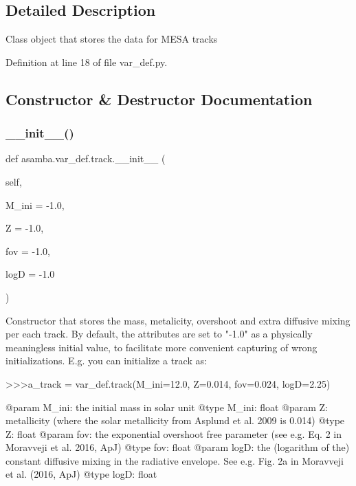 \subsection{Detailed Description}
\begin{DoxyVerb}Class object that stores the data for MESA tracks
\end{DoxyVerb}
 

Definition at line 18 of file var\+\_\+def.\+py.



\subsection{Constructor \& Destructor Documentation}
\mbox{\label{classasamba_1_1var__def_1_1track_a4b2441ffcfecbec92fb57d7d57aa3939}} 
\subsubsection{\texorpdfstring{\+\_\+\+\_\+init\+\_\+\+\_\+()}{\_\_init\_\_()}}
{\footnotesize\ttfamily def asamba.\+var\+\_\+def.\+track.\+\_\+\+\_\+init\+\_\+\+\_\+ (\begin{DoxyParamCaption}\item[{}]{self,  }\item[{}]{M\+\_\+ini = {\ttfamily -\/1.0},  }\item[{}]{Z = {\ttfamily -\/1.0},  }\item[{}]{fov = {\ttfamily -\/1.0},  }\item[{}]{logD = {\ttfamily -\/1.0} }\end{DoxyParamCaption})}

\begin{DoxyVerb}Constructor that stores the mass, metalicity, overshoot and extra diffusive mixing per each 
track. By default, the attributes are set to "-1.0" as a physically meaningless initial value,
to facilitate more convenient capturing of wrong initializations. E.g. you can initialize a track
as:

>>>a_track = var_def.track(M_ini=12.0, Z=0.014, fov=0.024, logD=2.25)

@param M_ini: the initial mass in solar unit
@type M_ini: float
@param Z: metallicity (where the solar metallicity from Asplund et al. 2009 is 0.014)
@type Z: float
@param fov: the exponential overshoot free parameter (see e.g. Eq. 2 in Moravveji et al.
   2016, ApJ)
@type fov: float
@param logD: the (logarithm of the) constant diffusive mixing in the radiative envelope.
   See e.g. Fig. 2a in Moravveji et al. (2016, ApJ)
@type logD: float
\end{DoxyVerb}
 

